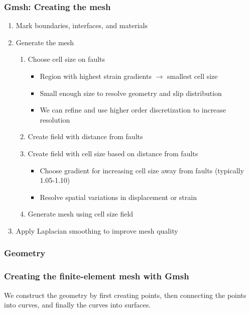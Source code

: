 \documentclass[aspectratio=169]{beamer}
\begin{document}
\begin{frame}
  \frametitle{Gmsh: Creating the mesh}
  
  \begin{enumerate}
  \item Mark boundaries, interfaces, and materials\pause
  \item Generate the mesh\pause
    \begin{enumerate}
    \item Choose cell size on faults
      \begin{itemize}
      \item Region with highest strain gradients $\rightarrow$ smallest cell size
      \item Small enough size to resolve geometry and slip distribution
      \item We can refine and use higher order discretization to increase resolution
      \end{itemize}\pause
    \item Create field with distance from faults\pause
    \item Create field with cell size based on distance from faults
      \begin{itemize}
      \item Choose gradient for increasing cell size away from faults (typically 1.05-1.10)
      \item Resolve spatial variations in displacement or strain
      \end{itemize}\pause
    \item Generate mesh using cell size field
    \end{enumerate}\pause
  \item Apply Laplacian smoothing to improve mesh quality
  \end{enumerate}
  
\end{frame}


\begin{frame}
  \frametitle{Geometry}
  \summary{}

  
\end{frame}


\begin{frame}
  \frametitle{Creating the finite-element mesh with Gmsh}
  \summary{}

  We construct the geometry by first creating points, then connecting the points into curves, and finally the curves into surfaces.
  
  
\end{frame}
\end{document}
